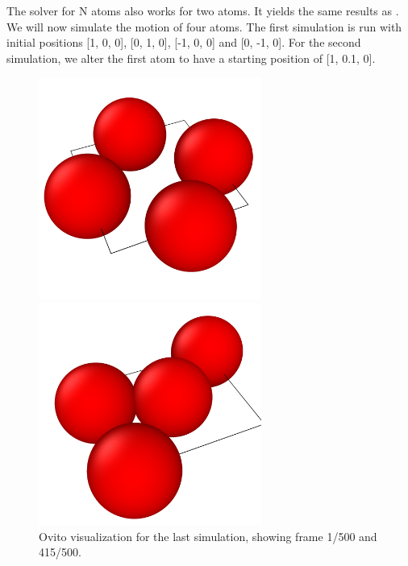 \documentclass[a4paper,10pt,english]{article}
\begin{document}
The solver for N atoms also works for two atoms. It yields the same results as \textit{}. We will now simulate the motion of four atoms. The first simulation is run with initial positions [1, 0, 0], [0, 1, 0], [-1, 0, 0] and [0, -1, 0]. For the second simulation, we alter the first atom to have a starting position of [1, 0.1, 0].

\begin{figure}[h]
    \centering
    \begin{minipage}{0.5\textwidth}
        \centering
        \includegraphics[width=0.65\textwidth]{../figures/3_b_iii_1.png}
    \end{minipage}\hfill
    \begin{minipage}{0.5\textwidth}
        \centering
        \includegraphics[width=0.65\textwidth]{../figures/3_b_iii_2.png}
    \end{minipage}
    \caption{Ovito visualization for the last simulation, showing frame 1/500 and 415/500.}
    \label{fig:ovito2}
\end{figure}
\end{document}

